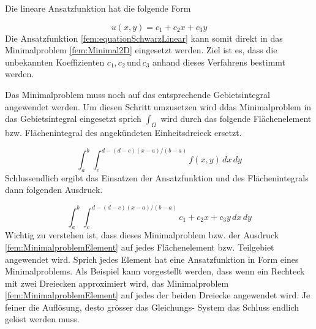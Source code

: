 



Die lineare Ansatzfunktion hat die folgende Form

\begin{equation}
u(x,y) = c_1 + c_2x + c_3y
\label{fem:equationSchwarzLinear}
\end{equation}
Die Ansatzfunktion \ref{fem:equationSchwarzLinear} kann somit direkt in das Minimalproblem \ref{fem:Minimal2D} eingesetzt werden. Ziel ist es, dass die unbekannten Koeffizienten $c_1, c_2 \, $und$ \, c_3$ anhand dieses Verfahrens bestimmt werden.

Das Minimalproblem muss noch auf das entsprechende Gebietsintegral angewendet werden. Um diesen Schritt umzusetzen wird ddas Minimalproblem in das Gebietsintegral eingesetzt sprich $\int_{\Omega}$ wird durch das folgende Flächenelement bzw. Flächenintegral des angekündeten Einheitsdreieck ersetzt. 

\begin{equation}
\int_a^b \int_c^{d-(d-c)(x-a)/(b-a)} f(x,y) \, dx\,dy
\label{fem:FlaecheDreieck}
\end{equation}
Schlussendlich ergibt das Einsatzen der Ansatzfunktion und des Flächenintegrals dann folgenden Ausdruck.

\begin{equation}
\int_a^b \int_c^{d-(d-c)(x-a)/(b-a)} c_1 + c_2x + c_3y \, dx \, dy
\label{fem:MinimalproblemElement}
\end{equation}
Wichtig zu verstehen ist, dass dieses Minimalproblem bzw. der Ausdruck \ref{fem:MinimalproblemElement} auf jedes Flächenelement bzw. Teilgebiet angewendet wird. Sprich jedes Element hat eine Ansatzfunktion in Form eines Minimalproblems. Als Beispiel kann vorgestellt werden, dass wenn ein Rechteck mit zwei Dreiecken approximiert wird, das Minimalproblem \ref{fem:MinimalproblemElement} auf jedes der beiden Dreiecke angewendet wird. Je feiner die Auflösung, desto grösser das Gleichungs- System das Schluss endlich gelöst werden muss.

